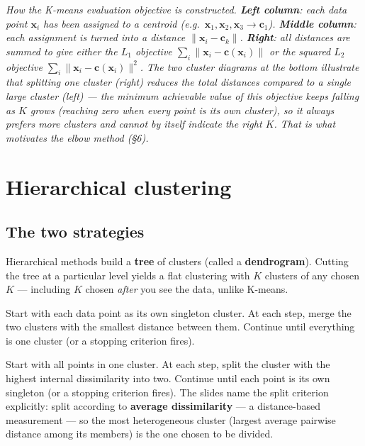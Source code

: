 \documentclass[11pt, a4paper]{article}
\begin{document}
\begin{center}

\footnotesize\textit{How the K-means evaluation objective is constructed. \textbf{Left column}: each data point $\mathbf{x}_i$ has been assigned to a centroid (e.g.\ $\mathbf{x}_1, \mathbf{x}_2, \mathbf{x}_3 \to \mathbf{c}_1$). \textbf{Middle column}: each assignment is turned into a distance $\|\mathbf{x}_i - \mathbf{c}_k\|$. \textbf{Right}: all distances are summed to give either the $L_1$ objective $\sum_i \|\mathbf{x}_i - \mathbf{c}(\mathbf{x}_i)\|$ or the squared $L_2$ objective $\sum_i \|\mathbf{x}_i - \mathbf{c}(\mathbf{x}_i)\|^2$. The two cluster diagrams at the bottom illustrate that splitting one cluster (right) reduces the total distances compared to a single large cluster (left) --- the \emph{minimum achievable} value of this objective keeps falling as $K$ grows (reaching zero when every point is its own cluster), so it always prefers more clusters and cannot by itself indicate the right $K$. That is what motivates the elbow method (\S6).}
\end{center}

\section{Hierarchical clustering}

\subsection{The two strategies}

Hierarchical methods build a \textbf{tree} of clusters (called a \textbf{dendrogram}). Cutting the tree at a particular level yields a flat clustering with $K$ clusters of any chosen $K$ — including $K$ chosen \emph{after} you see the data, unlike K-means.

\begin{defbox}
Start with each data point as its own singleton cluster. At each step, merge the two clusters with the smallest distance between them. Continue until everything is one cluster (or a stopping criterion fires).
\end{defbox}

\begin{defbox}
Start with all points in one cluster. At each step, split the cluster with the highest internal dissimilarity into two. Continue until each point is its own singleton (or a stopping criterion fires). The slides name the split criterion explicitly: split according to \textbf{average dissimilarity} — a distance-based measurement — so the most heterogeneous cluster (largest average pairwise distance among its members) is the one chosen to be divided.
\end{defbox}
\end{document}
